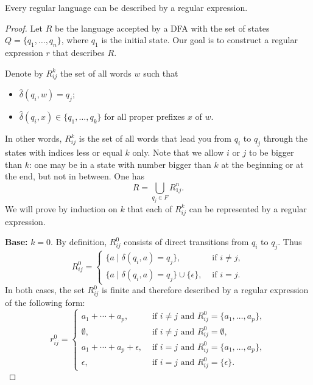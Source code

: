 \begin{page}
\setcounter{section}{2}
\setcounter{subsection}{2}
\setcounter{dfn}{10}
\label{portion:1103}

\begin{lem}
Every regular language can be described by a regular expression.
\end{lem}

\end{page}

\begin{page}
\setcounter{section}{2}
\setcounter{subsection}{2}
\setcounter{dfn}{10}
\label{portion:1104}

\begin{proof}
Let $R$ be the language accepted by a DFA with the set of states $Q = \{q_1, \ldots, q_n\}$, where $q_1$ is the initial state.
Our goal is to construct a regular expression $r$ that describes $R$.

Denote by $R_{ij}^k$ the set of all words $w$ such that
\begin{itemize}
\item
$\widehat{\delta}(q_i, w) = q_j$;
\item
$\widehat{\delta}(q_i, x) \in \{q_1, \ldots, q_k\}$ for all proper prefixes $x$ of $w$.
\end{itemize}
In other words, $R_{ij}^k$ is the set of all words that lead you from $q_i$ to $q_j$
through the states with indices less or equal $k$ only.
Note that we allow $i$ or $j$ to be bigger than $k$: one may be in a state with number bigger than $k$ at the beginning or at the end, but not in between.
One has
\[
R = \bigcup_{q_j \in F} R_{1j}^n.
\]
We will prove by induction on $k$ that each of $R_{ij}^k$ can be represented by a regular expression.

\textbf{Base:} $k = 0$.
By definition, $R_{ij}^0$ consists of direct transitions from $q_i$ to $q_j$. Thus
\[
R_{ij}^0 =
\begin{cases}
\{a \mid \delta(q_i, a) = q_j\}, &\text{ if } i \ne j,\\
\{a \mid \delta(q_i, a) = q_j\} \cup \{\epsilon\}, &\text{ if } i = j.
\end{cases}
\]
In both cases, the set $R_{ij}^0$ is finite and therefore described by a regular expression of the following form:
\[
r_{ij}^0 =
\begin{cases}
a_1 + \cdots + a_p, &\text{ if } i \ne j \text{ and } R_{ij}^0 = \{a_1, \ldots, a_p\},\\
\emptyset, &\text{ if } i \ne j \text{ and } R_{ij}^0 = \emptyset,\\
a_1 + \cdots + a_p + \epsilon, &\text{ if } i = j \text{ and } R_{ij}^0 = \{a_1, \ldots, a_p\},\\
\epsilon, &\text{ if } i = j \text{ and }R_{ij}^0 = \{\epsilon\}.
\end{cases}
\]


\end{proof}
\end{page}
